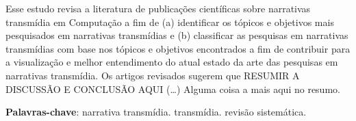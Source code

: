 \documentclass[
article,			%
11pt,				%
oneside,			%
a4paper,			%
english,			%
brazil,				%
sumario=tradicional
]{abntex2}
\begin{document}

  \frenchspacing


  \maketitle

  \begin{resumoumacoluna}
    Esse estudo revisa a literatura de publicações científicas sobre narrativas transmídia em Computação a fim de (a) identificar os tópicos e objetivos mais pesquisados em narrativas transmídias e (b) classificar as pesquisas em narrativas transmídias com base nos tópicos e objetivos encontrados a fim de contribuir para a visualização e melhor entendimento do atual estado da arte das pesquisas em narrativas transmídia. Os artigos revisados sugerem que \textsf{RESUMIR A DISCUSSÃO E CONCLUSÃO AQUI} (\ldots) Alguma coisa a mais aqui no resumo.

    \vspace{\onelineskip}

    \noindent
    \textbf{Palavras-chave}: narrativa transmídia. transmídia. revisão sistemática.
  \end{resumoumacoluna}


  \textual

\end{document}
